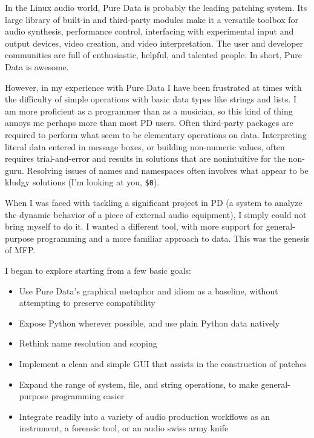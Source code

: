 \documentclass[11pt,a4paper]{article}
\begin{document}
In the Linux audio world, Pure Data is probably the leading patching
system.  Its large library of built-in and third-party modules make it a
versatile toolbox for audio synthesis, performance control, interfacing
with experimental input and output devices, video creation, and video
interpretation.  The user and developer communities are full of
enthusiastic, helpful, and talented people.  In short, Pure Data is
awesome.

However, in my experience with Pure Data I have been frustrated at times
with the difficulty of simple operations with basic data types like strings
and lists.  I am more proficient as a programmer than as a musician, so
this kind of thing annoys me perhaps more than most PD users.  Often
third-party packages are required to perform what seem to be elementary
operations on data.  Interpreting literal data entered in message boxes, or
building non-numeric values, often requires trial-and-error and results in
solutions that are nonintuitive for the non-guru.  Resolving issues of
names and namespaces often involves what appear to be kludgy solutions (I'm
looking at you, \texttt{\$0}).

When I was faced with tackling a significant project in PD (a system to
analyze the dynamic behavior of a piece of external audio equipment), I
simply could not bring myself to do it.  I wanted a different tool, with
more support for general-purpose programming and a more familiar approach
to data.  This was the genesis of MFP.  

I began to explore starting from a few basic goals: 

\begin{itemize}
\item[]
Use Pure Data's graphical metaphor and idiom as a baseline, without
attempting to preserve compatibility 

\item[]
Expose Python wherever possible, and use plain Python data natively

\item[]
Rethink name resolution and scoping

\item[]
Implement a clean and simple GUI that assists in the construction 
of patches 

\item[]
Expand the range of system, file, and string operations, to make
general-purpose programming easier

\item[]
Integrate readily into a variety of audio production workflows as an
instrument, a forensic tool, or an audio swiss army knife
\end{itemize}
\end{document}
